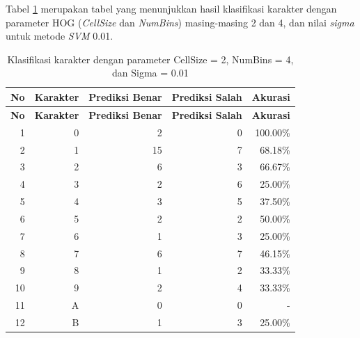 \noindent Tabel \ref{tab:hasilklasifikasisel2} merupakan tabel yang menunjukkan hasil klasifikasi karakter dengan parameter HOG (\textit{CellSize} dan \textit{NumBins}) masing-masing 2 dan 4, dan nilai \textit{sigma} untuk metode \textit{SVM} 0.01.

\begin{longtable}[c]{|r|r|r|r|r|}
	\caption{Klasifikasi karakter dengan parameter CellSize = 2, NumBins = 4, dan Sigma = 0.01}
	\label{tab:hasilklasifikasisel2}\\
	\hline
	\textbf{No} & \textbf{Karakter} & \textbf{Prediksi Benar} & \textbf{Prediksi Salah} & \textbf{Akurasi} \\ \hline
	\endfirsthead
	\hline
	\textbf{No} & \textbf{Karakter} & \textbf{Prediksi Benar} & \textbf{Prediksi Salah} & \textbf{Akurasi} \\ \hline
	\endhead
	1           & 0                 & 2                       & 0                       &100.00\%            \\ \hline
	2           & 1                 & 15                       & 7                       &68.18\%            \\ \hline
	3           & 2                 & 6                       & 3                       &66.67\%            \\ \hline
	4           & 3                 & 2                       & 6                       &25.00\%            \\ \hline
	5           & 4                 & 3                       & 5                       &37.50\%            \\ \hline
	6           & 5                 & 2                       & 2                       &50.00\%            \\ \hline
	7           & 6                 & 1                       & 3                       &25.00\%            \\ \hline
	8           & 7                 & 6                       & 7                       &46.15\%            \\ \hline
	9           & 8                 & 1                       & 2                       &33.33\%            \\ \hline
	10           & 9                 & 2                       & 4                       &33.33\%            \\ \hline
	11           & A                 & 0                       & 0                       & -            \\ \hline
	12           & B                 & 1                       & 3                       &25.00\%            \\ \hline

\end{longtable}
